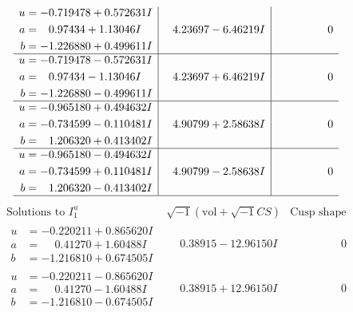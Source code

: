 \documentclass[1p]{elsarticle_modified}
\theoremstyle{definition}
\newcommand{\I}{\sqrt{-1}}
\begin{document}
$$\begin{array}{c|c|c}
\begin{aligned}
u &= -0.719478 + 0.572631 I \\
a &= \phantom{-}0.97434 + 1.13046 I \\
b &= -1.226880 + 0.499611 I\end{aligned}
 & \phantom{-}4.23697 - 6.46219 I & \phantom{-0.000000 } 0 \\ \hline\begin{aligned}
u &= -0.719478 - 0.572631 I \\
a &= \phantom{-}0.97434 - 1.13046 I \\
b &= -1.226880 - 0.499611 I\end{aligned}
 & \phantom{-}4.23697 + 6.46219 I & \phantom{-0.000000 } 0 \\ \hline\begin{aligned}
u &= -0.965180 + 0.494632 I \\
a &= -0.734599 - 0.110481 I \\
b &= \phantom{-}1.206320 + 0.413402 I\end{aligned}
 & \phantom{-}4.90799 + 2.58638 I & \phantom{-0.000000 } 0 \\ \hline\begin{aligned}
u &= -0.965180 - 0.494632 I \\
a &= -0.734599 + 0.110481 I \\
b &= \phantom{-}1.206320 - 0.413402 I\end{aligned}
 & \phantom{-}4.90799 - 2.58638 I & \phantom{-0.000000 } 0\\
 \hline 
 \end{array}$$\newpage$$\begin{array}{c|c|c}  
\text{Solutions to }I^u_{1}& \I (\text{vol} + \sqrt{-1}CS) & \text{Cusp shape}\\
 \hline 
\begin{aligned}
u &= -0.220211 + 0.865620 I \\
a &= \phantom{-}0.41270 + 1.60488 I \\
b &= -1.216810 + 0.674505 I\end{aligned}
 & \phantom{-}0.38915 - 12.96150 I & \phantom{-0.000000 } 0 \\ \hline\begin{aligned}
u &= -0.220211 - 0.865620 I \\
a &= \phantom{-}0.41270 - 1.60488 I \\
b &= -1.216810 - 0.674505 I\end{aligned}
 & \phantom{-}0.38915 + 12.96150 I & \phantom{-0.000000 } 0 \\ \hline\begin{aligned}

\end{aligned}
\end{array}$$
\end{document}

